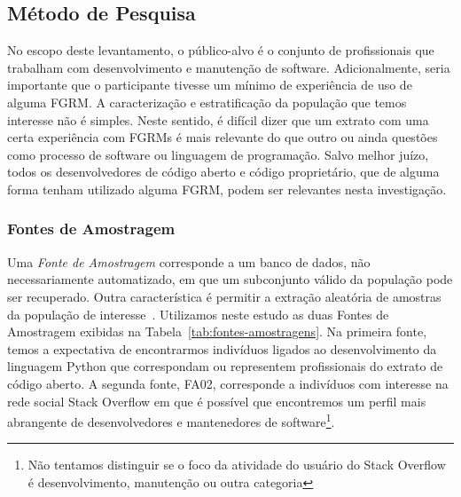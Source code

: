 \subsection{Método de Pesquisa}
\label{subsec:pesq_metodologias}

No escopo deste levantamento, o público-alvo é o conjunto de profissionais que
trabalham com desenvolvimento e manutenção de software. Adicionalmente, seria
importante que o participante tivesse um mínimo de experiência de uso de alguma
FGRM\@. A caracterização e estratificação da população que temos interesse não é
simples. Neste sentido, é difícil dizer que um extrato com uma certa experiência
com FGRMs é mais relevante do que outro ou ainda questões como processo de
software ou linguagem de programação. Salvo melhor juízo, todos os
desenvolvedores de código aberto e código proprietário, que de alguma forma
tenham utilizado alguma FGRM, podem ser relevantes nesta investigação.

\subsubsection{Fontes de Amostragem}
\label{subsubsec:fontes_amostragem}

Uma \textit{Fonte de Amostragem} corresponde a um banco de dados, não
necessariamente automatizado, em que um subconjunto válido da população pode ser
recuperado. Outra característica é permitir a extração aleatória de amostras da
população de interesse~\cite{de2014towards}. Utilizamos neste estudo as duas
Fontes de Amostragem exibidas na Tabela~\ref{tab:fontes-amostragens}. Na
primeira fonte, temos a expectativa de encontrarmos indivíduos ligados ao
desenvolvimento da linguagem Python que correspondam ou representem
profissionais do extrato de código aberto. A segunda fonte, FA02, corresponde a
indivíduos com interesse na rede social Stack Overflow em que é possível que
encontremos um perfil mais abrangente de desenvolvedores e mantenedores de
software\footnote{Não tentamos distinguir se o foco da atividade do usuário do
    Stack Overflow é desenvolvimento, manutenção ou outra categoria}.

\begin{table}[htpb]
\centering
{}
\caption{Fontes de Amostragem utilizadas no estudo}
\label{tab:fontes-amostragens}
\end{table}

